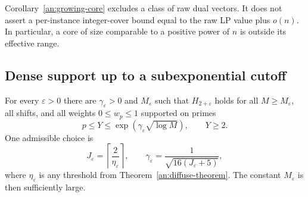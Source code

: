 Corollary~\ref{an:growing-core} excludes a class of raw dual vectors.
It does not assert a per-instance integer-cover bound equal to the raw
LP value plus \(o(n)\). In particular, a core of size comparable to
a positive power of \(n\) is outside its effective range.

\subsection{Dense support up to a subexponential cutoff}

\begin{theorem}
\label{an:subexp-hinge}
For every \(\varepsilon>0\) there are
\(\gamma_\varepsilon>0\) and \(M_\varepsilon\) such that
\(H_{2+\varepsilon}\) holds for all \(M\ge M_\varepsilon\), all
shifts, and all weights \(0\le w_p\le1\) supported on primes
\[
 p\le Y\le\exp(\gamma_\varepsilon\sqrt{\log M}),\qquad Y\ge2.
\]
One admissible choice is
\begin{equation}
 J_\varepsilon=\left\lceil\frac2{\eta_\varepsilon}\right\rceil,
 \qquad
 \gamma_\varepsilon=\frac1{\sqrt{16(J_\varepsilon+5)}},
 \label{an:gamma}
\end{equation}
where \(\eta_\varepsilon\) is any threshold from
Theorem~\ref{an:diffuse-theorem}. The constant
\(M_\varepsilon\) is then sufficiently large.
\end{theorem}

